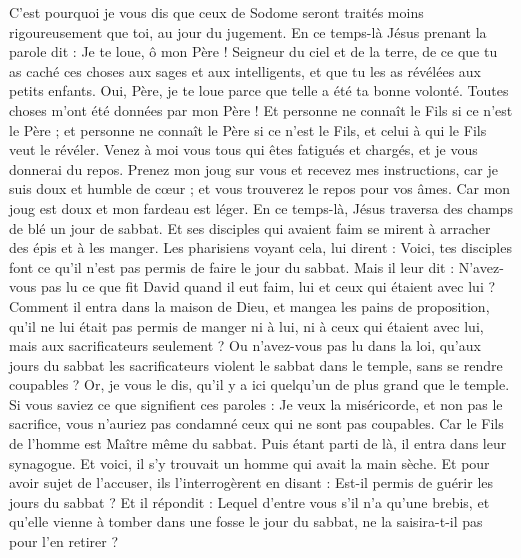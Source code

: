 \begin{multicols}{2}
C'est pourquoi je vous dis que ceux de Sodome seront traités moins rigoureusement que toi, au jour du jugement.
En ce temps-là Jésus prenant la parole dit : Je te loue, ô mon Père ! Seigneur du ciel et de la terre, de ce que tu as caché ces choses aux sages et aux intelligents, et que tu les as révélées aux petits enfants.
Oui, Père, je te loue parce que telle a été ta bonne volonté.
Toutes choses m'ont été données par mon Père ! Et personne ne connaît le Fils si ce n’est le Père ; et personne ne connaît le Père si ce n’est le Fils, et celui à qui le Fils veut le révéler.
Venez à moi vous tous qui êtes fatigués et chargés, et je vous donnerai du repos.
Prenez mon joug sur vous et recevez mes instructions, car je suis doux et humble de cœur ; et vous trouverez le repos pour vos âmes.
Car mon joug est doux et mon fardeau est léger.
\VerseOne{}En ce temps-là, Jésus traversa des champs de blé un jour de sabbat. Et ses disciples qui avaient faim se mirent à arracher des épis et à les manger.
Les pharisiens voyant cela, lui dirent : Voici, tes disciples font ce qu'il n'est pas permis de faire le jour du sabbat.
Mais il leur dit : N'avez-vous pas lu ce que fit David quand il eut faim, lui et ceux qui étaient avec lui ?
Comment il entra dans la maison de Dieu, et mangea les pains de proposition, qu’il ne lui était pas permis de manger ni à lui, ni à ceux qui étaient avec lui, mais aux sacrificateurs seulement ?
Ou n'avez-vous pas lu dans la loi, qu'aux jours du sabbat les sacrificateurs violent le sabbat dans le temple, sans se rendre coupables ?
Or, je vous le dis, qu'il y a ici quelqu'un de plus grand que le temple.
Si vous saviez ce que signifient ces paroles : Je veux la miséricorde, et non pas le sacrifice, vous n'auriez pas condamné ceux qui ne sont pas coupables.
Car le Fils de l'homme est Maître même du sabbat.
Puis étant parti de là, il entra dans leur synagogue.
Et voici, il s’y trouvait un homme qui avait la main sèche. Et pour avoir sujet de l'accuser, ils l'interrogèrent en disant : Est-il permis de guérir les jours du sabbat ?
Et il répondit : Lequel d’entre vous s'il n’a qu’une brebis, et qu'elle vienne à tomber dans une fosse le jour du sabbat, ne la saisira-t-il pas pour l’en retirer ?

\end{multicols}
